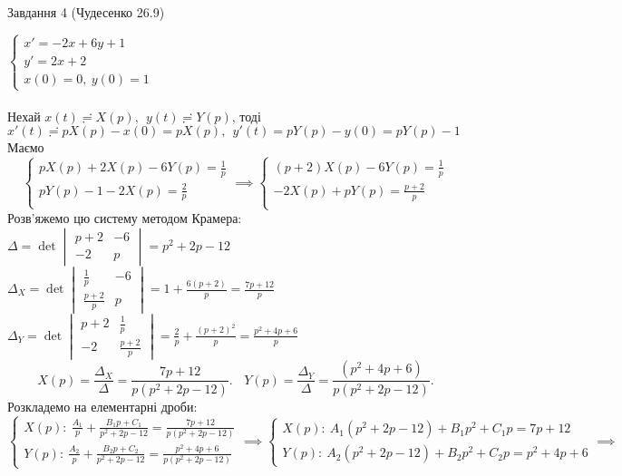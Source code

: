 \documentclass[12 pt]{article}
\begin{document}
 \begin{center}
    \large 
    Завдання 4 (Чудесенко 26.9)
\end{center}
$\begin{cases}
    x'=-2x+6y+1 \\ 
    y' = 2x + 2 \\ 
    x(0) = 0, \ y(0) = 1
\end{cases}$ \\ \\ 
Нехай $x(t) \risingdotseq X(p) , \ \ y(t) \risingdotseq Y(p)$, тоді
$x'(t) \risingdotseq  pX(p) - x(0) = pX(p), \ \ y'(t) = pY(p) - y(0) = pY(p)-1$  \\ 
Маємо 
$$\begin{cases}
    pX(p)+2X(p)-6Y(p) = \frac{1}{p} \\ 
    pY(p) - 1 - 2 X(p) = \frac{2}{p} \\ 
\end{cases}
\implies
\begin{cases}
    (p+2)X(p)-6Y(p) = \frac{1}{p} \\ 
    -2 X(p) + pY(p) = \frac{p+2}{p} \\ 
\end{cases}
$$
Розв'яжемо цю систему методом Крамера: \\ 
$\Delta= \det \begin{vmatrix}
    p+2 & -6 \\ 
    -2 & p
\end{vmatrix}= p^2 + 2p -12$  \\ 
$\Delta_X= \det \begin{vmatrix}
    \frac{1}{p} & -6 \\ 
    \frac{p+2}{p} & p
\end{vmatrix}= 1 +  \frac{6(p+2)}{p} = \frac{7p+12}{p}$ \\  
$\Delta_Y= \det \begin{vmatrix}
    p+2 & \frac{1}{p} \\ 
    -2 & \frac{p+2}{p}
\end{vmatrix}= \frac{2}{p} +  \frac{(p+2)^2}{p} = \frac{p^2+4p+6}{p}$ \\ 
$$
X(p) = \frac{\Delta_X}{\Delta} = 
\frac{7p+12}{p(p^2+2p-12)}. \ \ \ \ 
Y(p) = \frac{\Delta_Y}{\Delta} = 
\frac{(p^2 + 4p +6)}{p(p^2+2p-12)}.
$$
Розкладемо на елементарні дроби:
$$
\begin{cases}
    X(p): \  \frac{A_1 }{p} + \frac{B_1 p+C_1 }{p^2+2p-12}
     = \frac{7p+12}{p(p^2+2p-12)} \\ 
    Y(p): \  \frac{A_2 }{p} + \frac{B_2 p+C_2 }{p^2+2p-12} = \frac{p^2+4p+6}{p(p^2+2p-12)}
\end{cases} \implies
\begin{cases}
    X(p): \  A_1 (p^2+2p-12) + B_1 p^2 + C_1 p = 7p+12 \\ 
    Y(p): \ A_2 (p^2+2p-12) + B_2 p^2 + C_2 p = p^2+4p+6
\end{cases} \implies
$$
\end{document}
